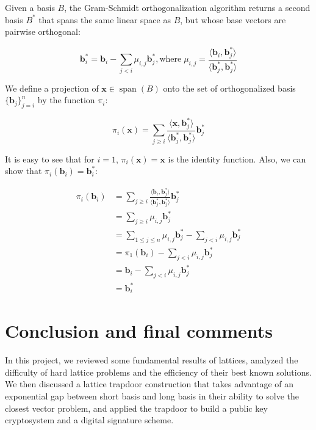\documentclass[letterpaper,12pt]{article}
\begin{document}
Given a basis $B$, the Gram-Schmidt orthogonalization algorithm returns a second basis $B^\ast$ that spans the same linear space as $B$, but whose base vectors are pairwise orthogonal:

$$
\mathbf{b}_i^\ast = \mathbf{b}_i - \sum_{j<i}\mu_{i, j}\mathbf{b}_j^\ast,
\text{where} \; \mu_{i, j} = \frac{
    \langle \mathbf{b}_i, \mathbf{b}_j^\ast\rangle
}{\langle \mathbf{b}_j^\ast, \mathbf{b}_j^\ast\rangle}
$$

We define a projection of $\mathbf{x} \in \operatorname{span}(B)$ onto the set of orthogonalized basis $\{\mathbf{b}_j\}_{j=i}^n$ by the function $\pi_i$:

$$
\pi_i(\mathbf{x}) = \sum_{j \geq i} \frac{
    \langle \mathbf{x}, \mathbf{b}_j^\ast\rangle
}{
    \langle \mathbf{b}_j^\ast, \mathbf{b}_j^\ast \rangle
} \mathbf{b}_j^\ast
$$

It is easy to see that for $i = 1$, $\pi_i(\mathbf{x}) = \mathbf{x}$ is the identity function. Also, we can show that $\pi_i(\mathbf{b}_i) = \mathbf{b}_i^\ast$:

$$
\begin{aligned}
\pi_i(\mathbf{b}_i) 
&= \sum_{j\geq i}\frac{\langle \mathbf{b}_i, \mathbf{b}_j^\ast\rangle}{\langle \mathbf{b}_j^\ast, \mathbf{b}_j^\ast \rangle}\mathbf{b}_j^\ast \\
&= \sum_{j\geq i}\mu_{i, j}\mathbf{b}_j^\ast \\
&= \sum_{1 \leq j \leq n}\mu_{i, j}\mathbf{b}_j^\ast  - \sum_{j < i}\mu_{i, j}\mathbf{b}_j^\ast \\
&= \pi_1(\mathbf{b}_i) - \sum_{j < i}\mu_{i, j}\mathbf{b}_j^\ast \\
&= \mathbf{b}_i - \sum_{j < i}\mu_{i, j}\mathbf{b}_j^\ast \\
&= \mathbf{b}_i^\ast
\end{aligned}
$$

% 



\section{Conclusion and final comments}
In this project, we reviewed some fundamental results of lattices, analyzed the difficulty of hard lattice problems and the efficiency of their best known solutions. We then discussed a lattice trapdoor construction that takes advantage of an exponential gap between short basis and long basis in their ability to solve the closest vector problem, and applied the trapdoor to build a public key cryptosystem and a digital signature scheme.
\end{document}
